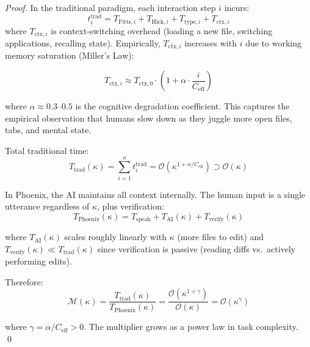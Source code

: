 \documentclass[11pt, a4paper]{article}
\begin{document}
\begin{proof}
In the traditional paradigm, each interaction step $i$ incurs:
\begin{equation}
  t_i^{\text{trad}} = T_{\text{Fitts},i} + T_{\text{Hick},i} + T_{\text{type},i} + T_{\text{ctx},i}
\end{equation}
where $T_{\text{ctx},i}$ is context-switching overhead (loading a new file,
switching applications, recalling state). Empirically, $T_{\text{ctx},i}$
increases with $i$ due to working memory saturation (Miller's Law):

\begin{equation}
  T_{\text{ctx},i} \approx T_{\text{ctx},0} \cdot \left(1 + \alpha \cdot \frac{i}{C_{\text{eff}}}\right)
  \label{eq:ctx_growth}
\end{equation}

where $\alpha \approx 0.3\text{--}0.5$ is the cognitive degradation
coefficient. This captures the empirical observation that humans slow down
as they juggle more open files, tabs, and mental state.

Total traditional time:
\begin{equation}
  T_{\text{trad}}(\kappa) = \sum_{i=1}^{\kappa} t_i^{\text{trad}} = \mathcal{O}\!\left(\kappa^{1+\alpha/C_{\text{eff}}}\right) \supset \mathcal{O}(\kappa)
\end{equation}

In Phoenix, the AI maintains all context internally. The human input is a single
utterance regardless of $\kappa$, plus verification:
\begin{equation}
  T_{\text{Phoenix}}(\kappa) = T_{\text{speak}} + T_{\text{AI}}(\kappa) + T_{\text{verify}}(\kappa)
\end{equation}

where $T_{\text{AI}}(\kappa)$ scales roughly linearly with $\kappa$ (more files
to edit) and $T_{\text{verify}}(\kappa) \ll T_{\text{trad}}(\kappa)$ since
verification is passive (reading diffs vs.\ actively performing edits).

Therefore:
\begin{equation}
  \mathcal{M}(\kappa) = \frac{T_{\text{trad}}(\kappa)}{T_{\text{Phoenix}}(\kappa)} = \frac{\mathcal{O}(\kappa^{1+\gamma})}{\mathcal{O}(\kappa)} = \mathcal{O}(\kappa^{\gamma})
  \label{eq:superlinear}
\end{equation}

where $\gamma = \alpha / C_{\text{eff}} > 0$. The multiplier grows as a power
law in task complexity. \qed
\end{proof}
\end{document}
